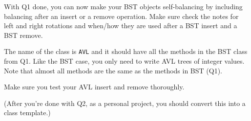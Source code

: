 
With Q1 done, you can now make your BST objects self-balancing by including
balancing after an insert or a remove operation.
Make sure check the notes for left and right rotations and when/how
they are used after a BST insert and a BST remove.

The name of the class is \verb!AVL! and it should have all the
methods in the BST class from Q1.
Like the BST case, you only need to write AVL trees of integer values.
Note that almost all methods are the same as the methods in BST (Q1).

Make sure you test your AVL insert and remove thoroughly.

(After you're done with Q2, as a personal project, you should convert this into
a class template.)


